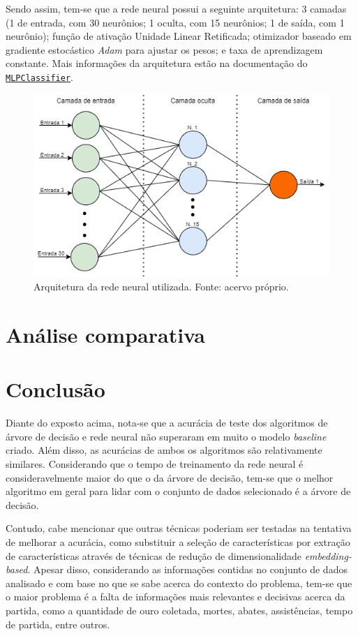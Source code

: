 \documentclass[12pt]{article}
\begin{document}
Sendo assim, tem-se que a rede neural possui a seguinte arquitetura: 3 camadas (1 de entrada, com 30 neurônios; 1 oculta, com 15 neurônios; 1 de saída, com 1 neurônio); função de ativação Unidade Linear Retificada; otimizador baseado em gradiente estocástico \textit{Adam} para ajustar os pesos; e taxa de aprendizagem constante. Mais informações da arquitetura estão na documentação do \href{https://scikit-learn.org/stable/modules/generated sklearn.neural_network.MLPClassifier.html}{\texttt{MLPClassifier}}.

\begin{figure}[t!]
    \includegraphics[width=\linewidth]{figures/ann}
    \caption{Arquitetura da rede neural utilizada. Fonte: acervo próprio.}
    \label{fig:ann}
\end{figure}

\section{Análise comparativa}\label{sec:analise}

\section{Conclusão}\label{sec:conclusao}
Diante do exposto acima, nota-se que a acurácia de teste dos algoritmos de árvore de decisão e rede neural não superaram em muito o modelo \textit{baseline} criado. Além disso, as acurácias de ambos os algoritmos são relativamente similares.  Considerando que o tempo de treinamento da rede neural é consideravelmente maior do que o da árvore de decisão, tem-se que o melhor algoritmo em geral para lidar com o conjunto de dados selecionado é a árvore de decisão. 

Contudo, cabe mencionar que outras técnicas poderiam ser testadas na tentativa de melhorar a acurácia, como substituir a seleção de características por extração de características através de técnicas de redução de dimensionalidade \textit{embedding-based}. Apesar disso, considerando as informações contidas no conjunto de dados analisado e com base no que se sabe acerca do contexto do problema, tem-se que o maior problema é a falta de informações mais relevantes e decisivas acerca da partida, como a quantidade de ouro coletada, mortes, abates, assistências, tempo de partida, entre outros. 
\end{document}
